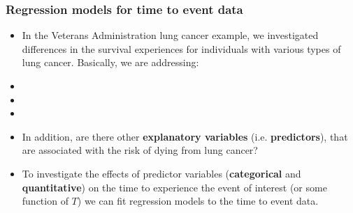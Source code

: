 \begin{frame}
\frametitle{Regression models for time to event data}
\begin{itemize}
\item In the Veterans Administration lung cancer example, we investigated differences in the survival experiences for individuals with various types of lung cancer.  Basically, we are addressing:
\item[]
\item[]
\item[]
\item In addition, are there other \textbf{explanatory variables} (i.e. \textbf{predictors}), that are associated with the risk of dying from lung cancer?
\item To investigate the effects of predictor variables (\textbf{categorical} and \textbf{quantitative}) on the time to experience the event of interest (or some function of $T$) we can fit regression models to the time to event data.

\end{itemize}
\end{frame}


